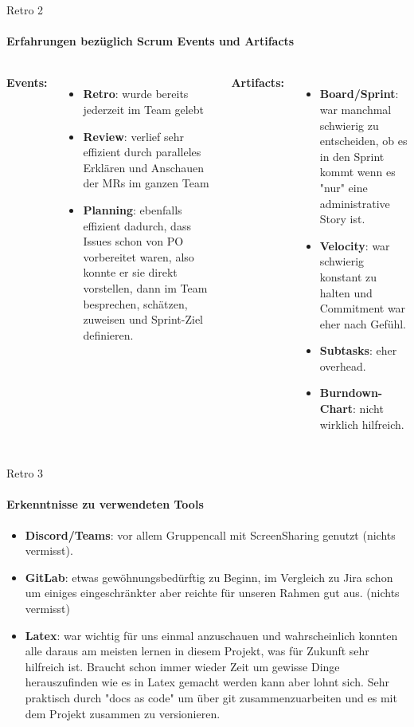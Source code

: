 \documentclass[
    ngerman,%
    authorontitle=true,
]{bfhbeamer}
\begin{document}
    \begin{frame}{Retro 2}
        \framesubtitle{Erfahrungen bezüglich Scrum Events und Artifacts}
        \begin{columns}
            \textbf{Events:}
            \begin{itemize}
                \item \textbf{Retro}: wurde bereits jederzeit im Team gelebt
                \item \textbf{Review}: verlief sehr effizient durch paralleles Erklären und Anschauen der MRs im ganzen Team
                \item \textbf{Planning}: ebenfalls effizient dadurch, dass Issues schon von PO vorbereitet waren,
                also konnte er sie direkt vorstellen, dann im Team besprechen, schätzen, zuweisen und Sprint-Ziel definieren.
            \end{itemize}

            \textbf{Artifacts:}
            \begin{itemize}
                \item \textbf{Board/Sprint}: war manchmal schwierig zu entscheiden, ob es in den Sprint kommt wenn es "nur" eine administrative Story ist.
                \item \textbf{Velocity}: war schwierig konstant zu halten und Commitment war eher nach Gefühl.
                \item \textbf{Subtasks}: eher overhead.
                \item \textbf{Burndown-Chart}: nicht wirklich hilfreich.
            \end{itemize}
        \end{columns}
    \end{frame}

    \begin{frame}{Retro 3}
        \framesubtitle{Erkenntnisse zu verwendeten Tools}
        \begin{itemize}
            \item \textbf{Discord/Teams}: vor allem Gruppencall mit ScreenSharing genutzt (nichts vermisst).
            \item \textbf{GitLab}: etwas gewöhnungsbedürftig zu Beginn, im Vergleich zu Jira schon um einiges eingeschränkter aber reichte für unseren Rahmen gut aus.
            (nichts vermisst)
            \item \textbf{Latex}: war wichtig für uns einmal anzuschauen und wahrscheinlich konnten alle daraus am meisten lernen in diesem Projekt, was für Zukunft sehr hilfreich ist.
            Braucht schon immer wieder Zeit um gewisse Dinge herauszufinden wie es in Latex gemacht werden kann aber lohnt sich.
            Sehr praktisch durch "docs as code" um über git zusammenzuarbeiten und es mit dem Projekt zusammen zu versionieren.
        \end{itemize}
    \end{frame}
\end{document}
